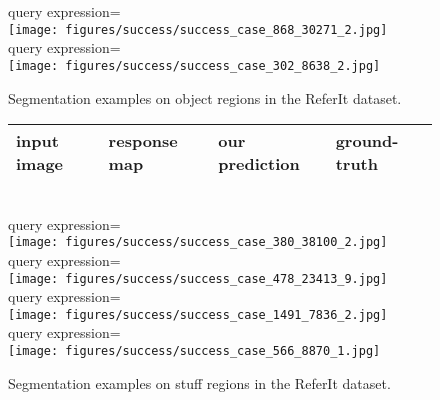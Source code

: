 \documentclass[runningheads]{llncs}
\begin{document}
\begin{figure}
\small{query expression=} \\
\texttt{[image: figures/success/success\_case\_868\_30271\_2.jpg]} \\
\small{query expression=} \\
\texttt{[image: figures/success/success\_case\_302\_8638\_2.jpg]} \\
\caption{Segmentation examples on object regions in the ReferIt dataset.}
\label{fig:sample_object}
\end{figure}

\begin{figure}
\centering
\begin{tabularx}{0.95\linewidth}{YYYY}
input image & response map & our prediction & ground-truth \\ \hline
\end{tabularx} \\
\small{query expression=} \\
\texttt{[image: figures/success/success\_case\_380\_38100\_2.jpg]} \\
\small{query expression=} \\
\texttt{[image: figures/success/success\_case\_478\_23413\_9.jpg]} \\
\small{query expression=} \\
\texttt{[image: figures/success/success\_case\_1491\_7836\_2.jpg]} \\
\small{query expression=} \\
\texttt{[image: figures/success/success\_case\_566\_8870\_1.jpg]} \\
\caption{Segmentation examples on stuff regions in the ReferIt dataset.}
\label{fig:sample_stuff}

\vspace{0.25 cm}


\end{figure}
\end{document}
